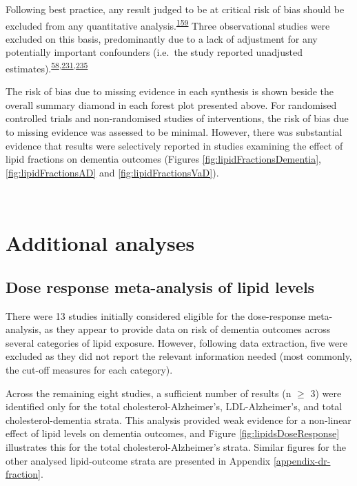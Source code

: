 \documentclass[a4paper, twoside]{templates/ociamthesis}
\begin{document}
Following best practice, any result judged to be at critical risk of bias should be excluded from any quantitative analysis.\textsuperscript{\protect\hyperlink{ref-sterne2016}{159}} Three observational studies were excluded on this basis, predominantly due to a lack of adjustment for any potentially important confounders (i.e.~the study reported unadjusted estimates).\textsuperscript{\protect\hyperlink{ref-mainous2005}{58},\protect\hyperlink{ref-kuo2015}{231},\protect\hyperlink{ref-notkola1998}{235}}

The risk of bias due to missing evidence in each synthesis is shown beside the overall summary diamond in each forest plot presented above. For randomised controlled trials and non-randomised studies of interventions, the risk of bias due to missing evidence was assessed to be minimal. However, there was substantial evidence that results were selectively reported in studies examining the effect of lipid fractions on dementia outcomes (Figures \ref{fig:lipidFractionsDementia}, \ref{fig:lipidFractionsAD} and \ref{fig:lipidFractionsVaD}).

~

\hypertarget{additional-analyses-1}{%
\section{Additional analyses}\label{additional-analyses-1}}

\hypertarget{dose-response-results}{%
\subsection{Dose response meta-analysis of lipid levels}\label{dose-response-results}}

There were 13 studies initially considered eligible for the dose-response meta-analysis, as they appear to provide data on risk of dementia outcomes across several categories of lipid exposure. However, following data extraction, five were excluded as they did not report the relevant information needed (most commonly, the cut-off measures for each category).

Across the remaining eight studies, a sufficient number of results (n \(\geqslant\) 3) were identified only for the total cholesterol-Alzheimer's, LDL-Alzheimer's, and total cholesterol-dementia strata. This analysis provided weak evidence for a non-linear effect of lipid levels on dementia outcomes, and Figure \ref{fig:lipidsDoseResponse} illustrates this for the total cholesterol-Alzheimer's strata. Similar figures for the other analysed lipid-outcome strata are presented in Appendix \ref{appendix-dr-fraction}.
\end{document}
